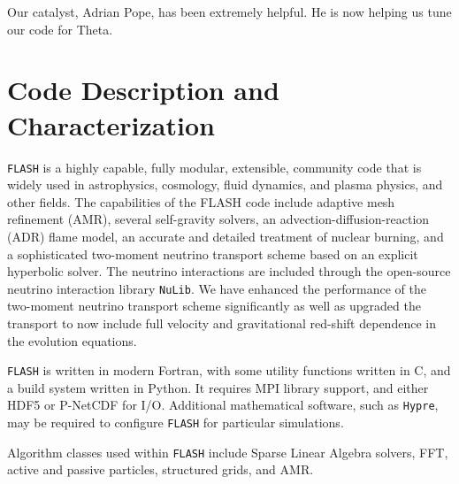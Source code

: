 \documentclass[12pt,titlepage]{article}
\begin{document}
Our catalyst, Adrian Pope, has been extremely helpful.
He is now helping us tune our code for Theta.


\section{Code Description and Characterization}

\texttt{FLASH} is a highly capable, fully modular, extensible,
community code that is widely used in astrophysics, cosmology, fluid
dynamics, and plasma physics, and other fields.  The capabilities of
the FLASH code include adaptive mesh refinement (AMR), several
self-gravity solvers, an advection-diffusion-reaction (ADR) flame
model, an accurate and detailed treatment of nuclear burning, and a
sophisticated two-moment neutrino transport scheme based on an
explicit hyperbolic solver.  The neutrino interactions are included
through the open-source neutrino interaction library
\texttt{NuLib}. We have enhanced the
performance of the two-moment neutrino transport scheme significantly
as well as upgraded the transport to now include full velocity and
gravitational red-shift dependence in the evolution equations.

\texttt{FLASH} is written in modern Fortran, with some utility
functions written in C, and a build system written in Python.  It
requires MPI library support, and either HDF5 or P-NetCDF for I/O.
Additional mathematical software, such as \texttt{Hypre}, may be
required to configure \texttt{FLASH} for particular simulations.

Algorithm classes used within \texttt{FLASH} include Sparse Linear
Algebra solvers, FFT, active and passive particles, structured grids,
and AMR.
\end{document}
